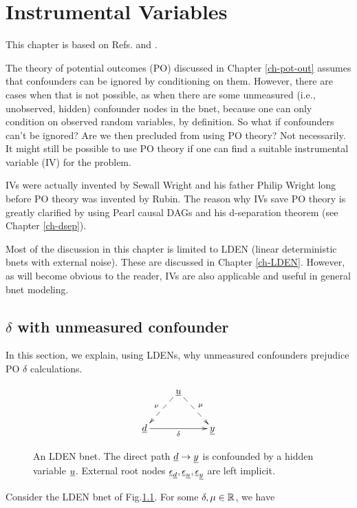 \chapter{Instrumental Variables}
\label{ch-instrumental}


This chapter is based on
Refs.\cite{book-mixtape} and \cite{wiki-inst-vars}.

The theory of potential outcomes (PO)
discussed in Chapter \ref{ch-pot-out}
assumes that confounders can be ignored
by conditioning on them.
However, there are cases when
that is not possible, as when there are some
unmeasured (i.e., unobserved, hidden)
confounder nodes in the bnet,
because one can
only condition on observed random 
variables, by definition.
So what if confounders can't be ignored?
Are we then precluded from using PO theory?
Not necessarily.
It might still be possible to
use PO theory if one can find a suitable
instrumental variable (IV) for the problem.

IVs were actually invented 
by Sewall Wright and his father Philip
Wright long before
PO theory was invented  by Rubin.
The reason why IVs save PO theory
is greatly clarified by using
Pearl causal DAGs and his d-separation theorem 
(see Chapter \ref{ch-dsep}).

Most of the discussion in this chapter
is  limited to LDEN (linear deterministic
bnets with external noise). These
are discussed in Chapter \ref{ch-LDEN}.
However, as will become
obvious to the reader, IVs are 
also applicable
and useful
in general bnet modeling.


\section{$\delta$ with unmeasured confounder}

In this section,
we explain, using LDENs,
why
unmeasured confounders 
prejudice PO $\delta$ calculations.

\begin{figure}[h!]
$$
\xymatrix{
&\rvu\ar@{-->}[dl]_\nu\ar@{-->}[dr]^\mu
\\
\rvd\ar[rr]_\delta&&\rvy
}$$
\caption{An LDEN bnet. The direct path $\rvd\rarrow\rvy$
is confounded by
a hidden variable $\rvu$.
External root nodes $\rveps_\rvd,
\rveps_\rvu, \rveps_\rvy$ are left implicit. 
} 
\label{fig-iv-G-start}
\end{figure}

Consider 
the LDEN bnet of Fig.\ref{fig-iv-G-start}.
For some $\delta, \mu\in { \mathbb{R}}$, we have

